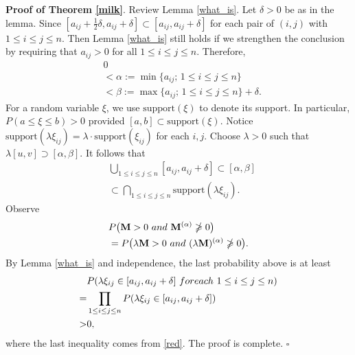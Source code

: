 \documentclass[conference,letterpaper]{IEEEtran}
\numberwithin{equation}{section}
\newcommand{\lbl}{\label}
\newcommand{\bd}{\bold}
\newcommand{\beaa}{\begin{eqnarray*}}
\newcommand{\eeaa}{\end{eqnarray*}}
\newcommand{\bea}{\begin{eqnarray}}
\newcommand{\eea}{\end{eqnarray}}
\begin{document}
\noindent\textbf{Proof of Theorem \ref{milk}}. Review Lemma \ref{what_is}. Let $\delta >0$ be as in the lemma. Since $[a_{ij}+\frac{1}{2}\delta, a_{ij}+\delta] \subset [a_{ij}, a_{ij}+\delta]$  for each pair of $(i, j)$ with $1\leq i\leq j \leq n.$ Then Lemma \ref{what_is} still holds if we strengthen the conclusion by requiring  that $a_{ij}>0$ for all $1\leq i\leq j \leq n.$ Therefore,
\bea\lbl{poker}
&0\\
&<\alpha:=\min\{a_{ij};\, 1\leq i\leq j \leq n\}\\
& < \beta:=\max\{a_{ij};\, 1\leq i\leq j \leq n\}+\delta.
\eea
For a random variable $\xi$, we use $\mbox{support}(\xi)$ to denote its support. In particular, $P(a\leq \xi\leq  b)>0$ provided $[a, b]\subset \mbox{support}(\xi)$.
Notice $\mbox{support}(\lambda\xi_{ij})=\lambda\cdot \mbox{support}(\xi_{ij})$ for each $i, j$. Choose $\lambda>0$ such that $\lambda [u, v]\supset [\alpha , \beta]$. It follows that
\bea\lbl{red}
& \bigcup_{1\leq i\leq  j\leq n}[a_{ij}, a_{ij}+\delta] \subset [\alpha, \beta]\\
& \subset \bigcap_{1\leq i\leq  j\leq n}  \mbox{support}(\lambda\xi_{ij}).
\eea
Observe
\beaa
& P\big(\bd{M}>0\ \mbox{and}\ \bd{M}^{(\alpha)}\ngeqslant 0\big)\\
& = P\big(\lambda\bd{M}>0\ \mbox{and}\ (\lambda\bd{M})^{(\alpha)}\ngeqslant 0\big).
\eeaa
By Lemma \ref{what_is} and independence, the last probability above is at least
\begin{align}\notag
& P(\lambda \xi_{ij}\in [a_{ij}, a_{ij}+\delta]\ \mbox{for each}\ 1\leq i\leq j \leq n)\\\notag
=& \prod_{1\leq i\leq j \leq n}P(\lambda\xi_{ij}\in [a_{ij}, a_{ij}+\delta])\\\notag
>& 0,\notag
\end{align}
where the last inequality comes from \eqref{red}. The proof is complete. \hfill$\square$

\medskip
\end{document}
